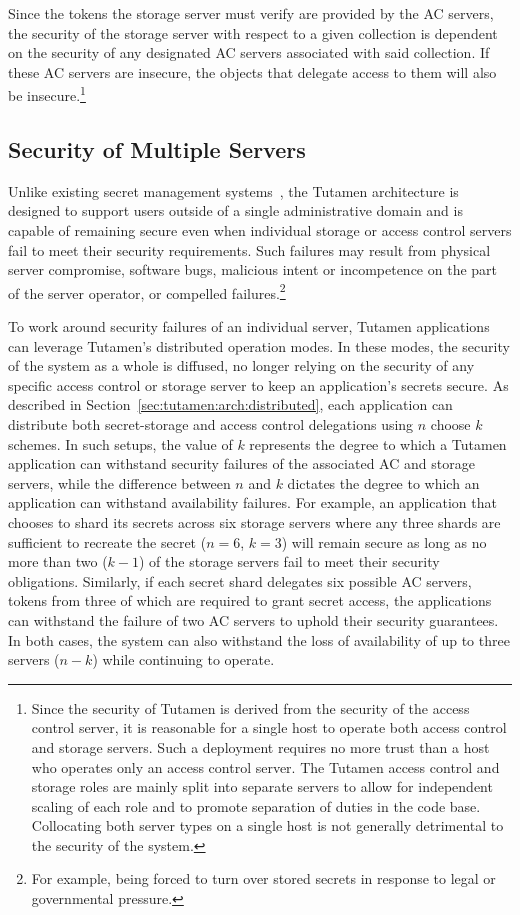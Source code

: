 Since the tokens the storage server must verify are provided by the AC
servers, the security of the storage server with respect to a given
collection is dependent on the security of any designated AC servers
associated with said collection. If these AC servers are insecure, the
objects that delegate access to them will also be
insecure.\footnote{Since the security of Tutamen is derived from the
  security of the access control server, it is reasonable for a single
  host to operate both access control and storage servers. Such a
  deployment requires no more trust than a host who operates only an
  access control server. The Tutamen access control and storage roles
  are mainly split into separate servers to allow for independent
  scaling of each role and to promote separation of duties in the code
  base. Collocating both server types on a single host is not
  generally detrimental to the security of the system.}

\subsection{Security of Multiple Servers}

Unlike existing secret management systems~\cite{vault, confidant,
  keywhiz}, the Tutamen architecture is designed to support users
outside of a single administrative domain and is capable of remaining
secure even when individual storage or access control servers fail to
meet their security requirements. Such failures may result from
physical server compromise, software bugs, malicious intent or
incompetence on the part of the server operator, or compelled
failures\cite{sayler-trust}.\footnote{For example, being forced to
  turn over stored secrets in response to legal or governmental
  pressure.}

To work around security failures of an individual server, Tutamen
applications can leverage Tutamen's distributed operation modes. In
these modes, the security of the system as a whole is diffused, no
longer relying on the security of any specific access control or
storage server to keep an application's secrets secure. As described
in Section~\ref{sec:tutamen:arch:distributed}, each application can
distribute both secret-storage and access control delegations using
$n$ choose $k$ schemes. In such setups, the value of $k$ represents
the degree to which a Tutamen application can withstand security
failures of the associated AC and storage servers, while the
difference between $n$ and $k$ dictates the degree to which an
application can withstand availability failures. For example, an
application that chooses to shard its secrets across six storage
servers where any three shards are sufficient to recreate the secret
($n=6$, $k=3$) will remain secure as long as no more than two ($k-1$)
of the storage servers fail to meet their security
obligations. Similarly, if each secret shard delegates six possible AC
servers, tokens from three of which are required to grant secret
access, the applications can withstand the failure of two AC servers
to uphold their security guarantees. In both cases, the system can
also withstand the loss of availability of up to three servers ($n-k$)
while continuing to operate.

